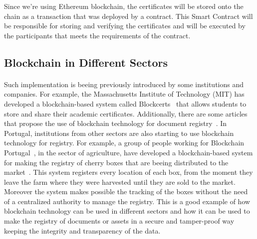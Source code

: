 Since we're using Ethereum blockchain, the certificates will be stored onto the chain as a transaction that was deployed by a contract.
This Smart Contract will be responsible for storing and verifying the certificates and will be executed by the participants that meets the requirements of the contract.

\subsection*{Blockchain in Different Sectors}\label{subsec:blockchain-different-sectors}
\paragraph{}

Such implementation is beeing previously introduced by some institutions and companies. For example, the Massachusetts Institute of Technology (MIT) has developed a blockchain-based system called Blockcerts~\cite{blockcerts}
that allows students to store and share their academic certificates. Additionally, there are some articles that propose the use of blockchain technology for document registry~\cite{app112411811, app14020706}.
In Portugal, institutions from other sectors are also starting to use blockchain technology for registry. For example, a group of people working for Blockchain Portugal~\cite{blockchainPortugal}, in the sector of agriculture,
have developed a blockchain-based system for making the registry of cherry boxes that are beeing distributed to the market~\cite{tertuliaCereja}.
This system registers every location of each box, from the moment they leave the farm where they were harvested until they are sold to the market. Moreover the system makes possible the tracking of the boxes without the need of a centralized authority to manage the registry.
This is a good example of how blockchain technology can be used in different sectors and how it can be used to make the registry of documents or assets in a secure and tamper-proof way keeping the integrity and transparency of the data.